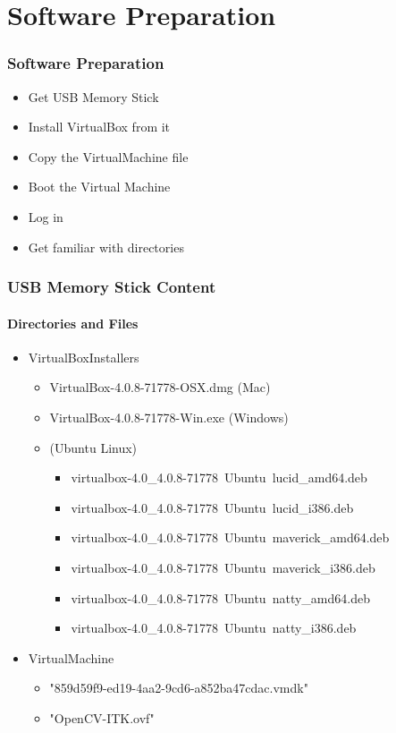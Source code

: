 \section{Software Preparation}


\begin{frame}
\frametitle{Software Preparation}
\begin{itemize}
\item Get USB Memory Stick
\pause
\item Install VirtualBox from it
\pause
\item Copy the VirtualMachine file
\pause
\item Boot the Virtual Machine
\pause
\item Log in
\pause
\item Get familiar with directories
\end{itemize}
\end{frame}


\begin{frame}
\frametitle{USB Memory Stick Content}
\framesubtitle{Directories and Files}
\begin{itemize}
\item VirtualBoxInstallers
\begin{itemize}
\item VirtualBox-4.0.8-71778-OSX.dmg (Mac)
\item VirtualBox-4.0.8-71778-Win.exe (Windows)
\item (Ubuntu Linux)
\begin{itemize}
\item virtualbox-4.0\_4.0.8-71778~Ubuntu~lucid\_amd64.deb
\item virtualbox-4.0\_4.0.8-71778~Ubuntu~lucid\_i386.deb
\item virtualbox-4.0\_4.0.8-71778~Ubuntu~maverick\_amd64.deb
\item virtualbox-4.0\_4.0.8-71778~Ubuntu~maverick\_i386.deb
\item virtualbox-4.0\_4.0.8-71778~Ubuntu~natty\_amd64.deb
\item virtualbox-4.0\_4.0.8-71778~Ubuntu~natty\_i386.deb
\end{itemize}
\end{itemize}
\pause
\item VirtualMachine
\begin{itemize}
\item  "{859d59f9-ed19-4aa2-9cd6-a852ba47cdac}.vmdk"
\item  "OpenCV-ITK.ovf"
\end{itemize}
\end{itemize}
\end{frame}


